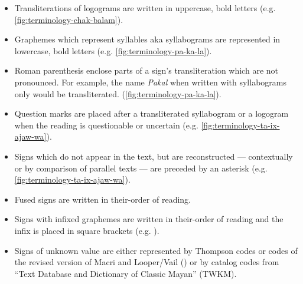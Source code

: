 \documentclass[../main.tex]{subfiles}
\begin{document}
\begin{itemize}
    \item Transliterations of logograms are written in uppercase, bold letters 
          (e.g. \cref{fig:terminology-chak-balam}).
    \item Graphemes which represent syllables aka syllabograms are represented in 
          lowercase, bold letters (e.g. \cref{fig:terminology-pa-ka-la}).
    \item Roman parenthesis enclose parts of a sign's transliteration which are not pronounced.
          For example, the name \emph{Pakal} when written with syllabograms only would be 
          transliterated.
          (\cref{fig:terminology-pa-ka-la}).
    \item Question marks are placed after a transliterated syllabogram or a 
          logogram when the reading is questionable or uncertain 
          (e.g. \cref{fig:terminology-ta-ix-ajaw-wa}).
    \item Signs which do not appear in the text, but are reconstructed 
          --- contextually or by comparison of parallel texts --- are preceded by an asterisk
          (e.g. \cref{fig:terminology-ta-ix-ajaw-wa}).
    \item Fused signs are written in their-order of reading.
    \item Signs with infixed graphemes are written in their-order of reading and the infix is placed
          in square brackets 
          (e.g. ).
    \item Signs of unknown value are either represented by Thompson codes or codes of the 
          revised version of Macri and Looper/Vail (\cites{macrilooper2003}{macrivail2009}) 
          or by catalog codes from ``Text Database and Dictionary of Classic Mayan'' (TWKM).
\end{itemize}
\end{document}
